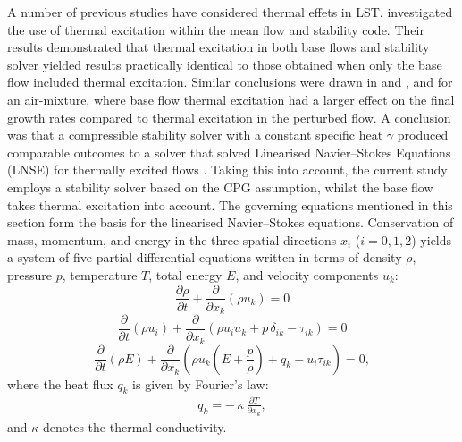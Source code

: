 A number of previous studies have considered thermal effets in \gls{LST}. \cite{Wartemann2019} investigated the use of thermal excitation within the mean flow and stability code. Their results demonstrated that thermal excitation in both base flows and stability solver yielded results practically identical to those obtained when only the base flow included thermal excitation. Similar conclusions were drawn in \cite{MortensenZhong2013} and \cite{miromiroThesis}, and \cite{BitterShepherd2015} for an air-mixture, where base flow thermal excitation had a larger effect on the final growth rates compared to thermal excitation in the perturbed flow. A conclusion was that a compressible stability solver with a constant specific heat $\gamma$ produced comparable outcomes to a solver that solved Linearised Navier--Stokes Equations (LNSE) for thermally excited flows \citep{Wartemann2019}. Taking this into account, the current study employs a stability solver based on the \gls{CPG} assumption, whilst the base flow takes thermal excitation into account. The governing equations mentioned in this section form the basis for the linearised Navier--Stokes equations. Conservation of mass, momentum, and energy in the three spatial directions $x_i$ ($i = 0, 1, 2$) yields a system of five partial differential equations written in terms of density $\rho$, pressure $p$, temperature $T$, total energy $E$, and velocity components $u_k$:
\begin{equation}
    \frac{\partial \rho}{\partial t} + \frac{\partial}{\partial x_k}\!\left(\rho u_k\right) = 0
\end{equation} \begin{equation}
    \frac{\partial}{\partial t}\!\left(\rho u_i\right)
+ \frac{\partial}{\partial x_k}\!\left(\rho u_i u_k + p\,\delta_{ik} - \tau_{ik}\right) = 0
\end{equation} \begin{equation}
    \frac{\partial}{\partial t}\!\left(\rho E\right)
+ \frac{\partial}{\partial x_k}\!\left(
  \rho u_k\!\left(E + \frac{p}{\rho}\right) + q_k - u_i \tau_{ik}
\right) = 0,
\end{equation}
where the heat flux $q_k$ is given by Fourier's law:
\begin{align}
q_k = -\,\kappa\,\frac{\partial T}{\partial x_k},
\end{align}
and $\kappa$ denotes the thermal conductivity.

